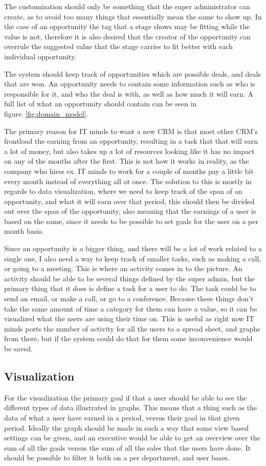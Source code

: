 The customization should only be something that the super administrator can create, as to avoid too many things that essentially mean the same to show up. In the case of an opportunity the tag that a stage shows may be fitting while the value is not, therefore it is also desired that the creator of the opportunity can overrule the suggested value that the stage carries to fit better with each individual opportunity.

The system should keep track of opportunities which are possible deals, and
deals that are won. An opportunity needs to contain some information such as who
is responsible for it, and who the deal is with, as well as how much it will
earn. A full list of what an opportunity should contain can be seen in
figure~\ref{fig:domain_model}.

The primary reason for IT minds to want a new CRM is that most other CRM's frontload the earning from an opportunity, resulting in a task that that will earn a lot of money, but also takes up a lot of resources looking like it has no impact on any of the months after the first. This is not how it works in reality, as the company who hires ex. IT minds to work for a couple of months pay a little bit every month instead of everything all at once. The solution to this is mostly in regards to data visualization, where we need to keep track of the span of an opportunity, and what it will earn over that period, this should then be divided out over the span of the opportunity, also meaning that the earnings of a user is based on the same, since it needs to be possible to set goals for the user on a per month basis.

Since an opportunity is a bigger thing, and there will be a lot of work related to a single one, I also need a way to keep track of smaller tasks, such as making a call, or going to a meeting. This is where an activity comes in to the picture. An activity should be able to be several things defined by the super admin, but the primary thing that it does is define a task for a user to do. The task could be to send an email, or make a call, or go to a conference. Because these things don't take the same amount of time a category for them can have a value, so it can be visualized what the users are using their time on. This is useful as right now IT minds ports the number of activity for all the users to a spread sheet, and graphs from there, but if the system could do that for them some inconvenience would be saved.

\subsection{Visualization}
\label{sub:Visualization}
For the visualization the primary goal if that a user should be able to see the different types of data illustrated in graphs. This means that a thing such as the data of what a user have earned in a period, versus their goal in that given period. Ideally the graph should be made in such a way that some view based settings can be given, and an executive would be able to get an overview over the sum of all the goals versus the sum of all the sales that the users have done. It should be possible to filter it both on a per department, and user bases.

